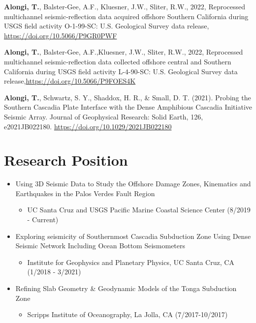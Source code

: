 \documentclass[11pt]{article}
\begin{document}
\textbf{Alongi, T.}, Balster-Gee, A.F., Kluesner, J.W., Sliter, R.W., 2022, Reprocessed multichannel seismic-reflection data acquired offshore Southern California during USGS field activity O-1-99-SC: U.S. Geological Survey data release, \url{https://doi.org/10.5066/P9GR0PWF}

\textbf{Alongi, T.}, Balster-Gee, A.F.,Kluesner, J.W., Sliter, R.W., 2022, Reprocessed multichannel seismic-reflection data collected offshore central and Southern California during USGS field activity L-4-90-SC: U.S. Geological Survey data release,\url{https://doi.org/10.5066/P9FOES4K}

\textbf{Alongi, T.}, Schwartz, S. Y., Shaddox, H. R., \& Small, D. T. (2021). Probing the Southern Cascadia Plate Interface with the Dense Amphibious Cascadia Initiative Seismic Array. Journal of Geophysical Research: Solid Earth, 126, e2021JB022180. \url{https://doi.org/10.1029/2021JB022180}

\section{Research Position}
\label{sec:orgfd707ef}
\begin{itemize}
\item Using 3D Seismic Data to Study the Offshore Damage Zones, Kinematics and Earthquakes in the Palos Verdes Fault Region
\begin{itemize}
\item UC Santa Cruz and USGS Pacific Marine Coastal Science Center (8/2019 - Current)
\end{itemize}

\item Exploring seismicity of Southernmost Cascadia Subduction Zone Using Dense Seismic Network Including Ocean Bottom Seismometers
\begin{itemize}
\item Institute for Geophysics and Planetary Physics, UC Santa Cruz, CA (1/2018 - 3/2021)
\end{itemize}

\item Refining Slab Geometry \& Geodynamic Models of the Tonga Subduction Zone
\begin{itemize}
\item Scripps Institute of Oceanography, La Jolla, CA (7/2017-10/2017)
\end{itemize}
\end{itemize}
\end{document}
